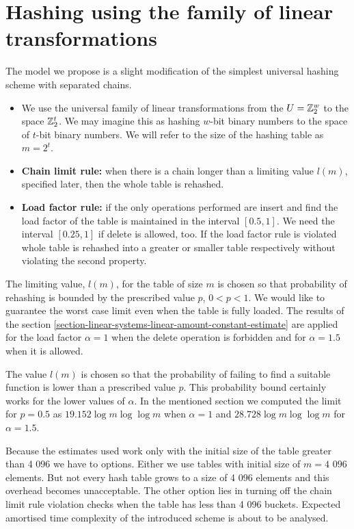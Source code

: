 \section{Hashing using the family of linear transformations}

The model we propose is a slight modification of the simplest universal hashing scheme with separated chains.
\begin{itemize}
\item We use the universal family of linear transformations from the $U = \mathbb{Z}_{2}^{w}$ to the space $\mathbb{Z}_{2}^{t}$. We may imagine this as hashing $w$-bit binary numbers to the space of $t$-bit binary numbers. We will refer to the size of the hashing table as $m = 2 ^ t$.
\item \textbf{Chain limit rule:} when there is a chain longer than a limiting value $l(m)$, specified later, then the whole table is rehashed.
\item \textbf{Load factor rule:} if the only operations performed are insert and find the load factor of the table is maintained in the interval $\left[0.5, 1\right]$. We need the interval $\left[0.25, 1\right]$ if delete is allowed, too. If the load factor rule is violated whole table is rehashed into a greater or smaller table respectively without violating the second property.
\end{itemize}

The limiting value, $l(m)$, for the table of size $m$ is chosen so that probability of rehashing is bounded by the prescribed value $p$, $0 < p < 1$. We would like to guarantee the worst case limit even when the table is fully loaded. The results of the section \ref{section-linear-systems-linear-amount-constant-estimate} are applied for the load factor $\alpha = 1$ when the delete operation is forbidden and for $\alpha = 1.5$ when it is allowed.

The value $l(m)$ is chosen so that the probability of failing to find a suitable function is lower than a prescribed value $p$. This probability bound certainly works for the lower values of $\alpha$. In the mentioned section we computed the limit for $p = 0.5$ as $19.152 \log m \log \log m$ when $\alpha = 1$ and $28.728 \log m \log \log m$ for $\alpha = 1.5$.

Because the estimates used work only with the initial size of the table greater than 4 096 we have to options. Either we use tables with initial size of $m = \text{4 096}$ elements. But not every hash table grows to a size of 4 096 elements and this overhead becomes unacceptable. The other option lies in turning off the chain limit rule violation checks when the table has less than 4 096 buckets. Expected amortised time complexity of the introduced scheme is about to be analysed.

